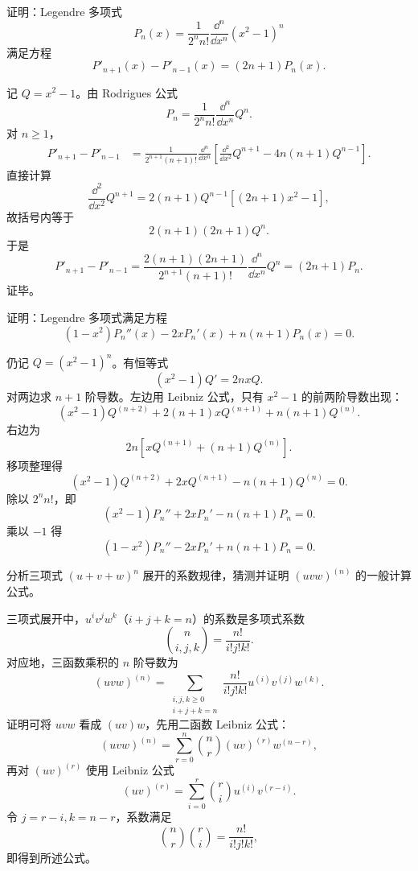 \begin{xreferenceproblem}[4]
证明：Legendre 多项式
  \[
    P_n(x)=\frac1{2^nn!}\frac{\dd^n}{\dd x^n}(x^2-1)^n
  \]
  满足方程
  \[
    P'_{n+1}(x)-P'_{n-1}(x)=(2n+1)P_n(x).
  \]
\end{xreferenceproblem}
\begin{xsolution}
记 $Q=x^2-1$。由 Rodrigues 公式
\[
  P_n=\frac1{2^nn!}\frac{\dd^n}{\dd x^n}Q^n.
\]
对 $n\ge1$，
\begin{align*}
  P'_{n+1}-P'_{n-1}
  &=\frac1{2^{n+1}(n+1)!}\frac{\dd^n}{\dd x^n}
  \left[\frac{\dd^2}{\dd x^2}Q^{n+1}-4n(n+1)Q^{n-1}\right].
\end{align*}
直接计算
\[
  \frac{\dd^2}{\dd x^2}Q^{n+1}
  =2(n+1)Q^{n-1}[(2n+1)x^2-1],
\]
故括号内等于
\[
  2(n+1)(2n+1)Q^n.
\]
于是
\[
  P'_{n+1}-P'_{n-1}
  =\frac{2(n+1)(2n+1)}{2^{n+1}(n+1)!}
   \frac{\dd^n}{\dd x^n}Q^n
  =(2n+1)P_n.
\]
证毕。
\end{xsolution}


\begin{xreferenceproblem}[5]
证明：Legendre 多项式满足方程
  \[
    (1-x^2)P_n''(x)-2xP_n'(x)+n(n+1)P_n(x)=0.
  \]
\end{xreferenceproblem}
\begin{xsolution}
仍记 $Q=(x^2-1)^n$。有恒等式
\[
  (x^2-1)Q'=2nxQ.
\]
对两边求 $n+1$ 阶导数。左边用 Leibniz 公式，只有 $x^2-1$ 的前两阶导数出现：
\[
  (x^2-1)Q^{(n+2)}+2(n+1)xQ^{(n+1)}+n(n+1)Q^{(n)}.
\]
右边为
\[
  2n\left[xQ^{(n+1)}+(n+1)Q^{(n)}\right].
\]
移项整理得
\[
  (x^2-1)Q^{(n+2)}+2xQ^{(n+1)}-n(n+1)Q^{(n)}=0.
\]
除以 $2^nn!$，即
\[
  (x^2-1)P_n''+2xP_n'-n(n+1)P_n=0.
\]
乘以 $-1$ 得
\[
  \boxed{(1-x^2)P_n''-2xP_n'+n(n+1)P_n=0}.
\]
\end{xsolution}


\begin{xreferenceproblem}[6]
分析三项式 $(u+v+w)^n$ 展开的系数规律，猜测并证明 $(uvw)^{(n)}$ 的一般计算公式。
\end{xreferenceproblem}
\begin{xsolution}
三项式展开中，$u^iv^jw^k$（$i+j+k=n$）的系数是多项式系数
\[
  \binom{n}{i,j,k}=\frac{n!}{i!j!k!}.
\]
对应地，三函数乘积的 $n$ 阶导数为
\[
  \boxed{
  (uvw)^{(n)}
  =\sum_{\substack{i,j,k\ge0\\i+j+k=n}}
  \frac{n!}{i!j!k!}
  u^{(i)}v^{(j)}w^{(k)}}.
\]
证明可将 $uvw$ 看成 $(uv)w$，先用二函数 Leibniz 公式：
\[
  (uvw)^{(n)}=\sum_{r=0}^n\binom nr(uv)^{(r)}w^{(n-r)},
\]
再对 $(uv)^{(r)}$ 使用 Leibniz 公式
\[
  (uv)^{(r)}=\sum_{i=0}^r\binom ri u^{(i)}v^{(r-i)}.
\]
令 $j=r-i,k=n-r$，系数满足
\[
  \binom nr\binom ri=\frac{n!}{i!j!k!},
\]
即得到所述公式。
\end{xsolution}


